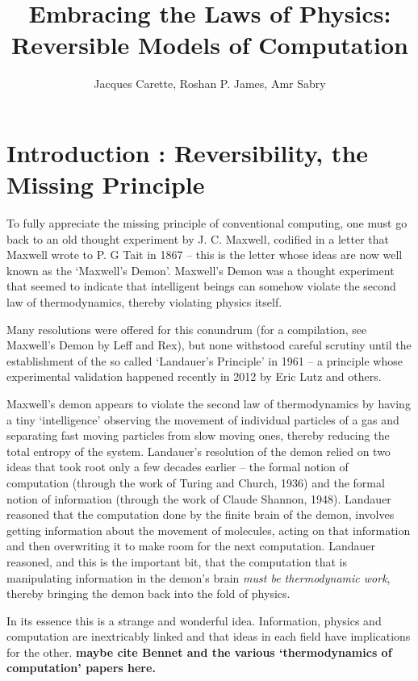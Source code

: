 \documentclass[12pt]{article}
\title{Embracing the Laws of Physics: \\ Reversible Models of Computation}
\author{Jacques Carette, Roshan P. James, Amr Sabry}
\newcommand{\roshan}[1]{\fbox{Roshan says:} \textbf{#1}}
\begin{document}
\maketitle

\section{Introduction : Reversibility, the Missing Principle}

To fully appreciate the missing principle of conventional computing,
one must go back to an old thought experiment by J. C. Maxwell,
codified in a letter that Maxwell wrote to P. G Tait in 1867 -- this
is the letter whose ideas are now well known as the `Maxwell's
Demon'. Maxwell's Demon was a thought experiment that seemed to
indicate that intelligent beings can somehow violate the second law of
thermodynamics, thereby violating physics itself.

Many resolutions were offered for this conundrum (for a compilation,
see Maxwell's Demon by Leff and Rex), but none withstood careful
scrutiny until the establishment of the so called `Landauer's
Principle' in 1961 -- a principle whose experimental validation
happened recently in 2012 by Eric Lutz and others.

Maxwell's demon appears to violate the second law of thermodynamics by
having a tiny `intelligence' observing the movement of individual
particles of a gas and separating fast moving particles from slow
moving ones, thereby reducing the total entropy of the
system. Landauer's resolution of the demon relied on two ideas that
took root only a few decades earlier -- the formal notion of
computation (through the work of Turing and Church, 1936) and the
formal notion of information (through the work of Claude Shannon,
1948). Landauer reasoned that the computation done by the finite brain
of the demon, involves getting information about the movement of
molecules, acting on that information and then overwriting it to make
room for the next computation.  Landauer reasoned, and this is the
important bit, that the computation that is manipulating information
in the demon's brain \textit{must be thermodynamic work}, thereby
bringing the demon back into the fold of physics.

In its essence this is a strange and wonderful idea. Information,
physics and computation are inextricably linked and that ideas in each
field have implications for the other. \roshan{maybe cite Bennet and
  the various `thermodynamics of computation' papers here.}
\end{document}
